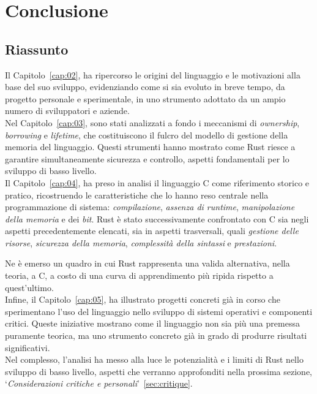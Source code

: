 
\chapter{Conclusione}\label{cap:06}
\section{Riassunto}
Il Capitolo~\ref{cap:02}, ha ripercorso le origini del linguaggio e le motivazioni alla base del suo sviluppo, 
evidenziando come si sia evoluto in breve tempo, da progetto personale e sperimentale, in uno strumento adottato da un ampio numero di sviluppatori e aziende. \hfill
\vspace{10pt}\\
\noindent Nel Capitolo~\ref{cap:03}, sono stati analizzati a fondo i meccanismi di \textit{ownership}, \textit{borrowing} e \textit{lifetime}, che costituiscono 
il fulcro del modello di gestione della memoria del linguaggio. 
Questi strumenti hanno mostrato come Rust riesce a garantire simultaneamente sicurezza e controllo, aspetti
fondamentali per lo sviluppo di basso livello. \hfill
\vspace{10pt}\\
\noindent Il Capitolo~\ref{cap:04}, ha preso in analisi il linguaggio C come riferimento
storico e pratico, ricostruendo le caratteristiche che lo hanno reso centrale nella programmazione di sistema: 
\textit{compilazione}, \textit{assenza di runtime}, \textit{manipolazione della memoria} e dei \textit{bit}.
Rust è stato successivamente confrontato con C sia negli aspetti precedentemente elencati, sia in 
aspetti trasversali, quali \textit{gestione delle risorse}, \textit{sicurezza della memoria}, \textit{complessità della sintassi} e \textit{prestazioni}.

Ne è emerso un quadro in cui Rust rappresenta una valida alternativa, nella teoria, a C, 
a costo di una curva di apprendimento più ripida rispetto a quest'ultimo. \hfill
\vspace{10pt}\\
\noindent Infine, il Capitolo~\ref{cap:05}, ha illustrato progetti
concreti già in corso che sperimentano l'uso del linguaggio nello sviluppo di sistemi operativi e 
componenti critici. Queste iniziative mostrano come il linguaggio non sia più una 
premessa puramente teorica, ma uno strumento concreto già in grado di produrre risultati significativi. \hfill
\vspace{10pt}\\
\noindent Nel complesso, l'analisi ha messo alla luce le potenzialità e i limiti di Rust nello sviluppo di 
basso livello, aspetti che verranno approfonditi nella prossima sezione, `\textit{Considerazioni critiche e personali}'~\ref{sec:critique}.

